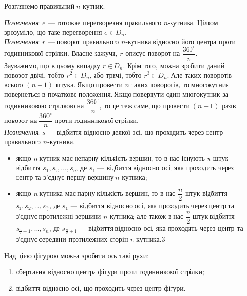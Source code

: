 \documentclass{math_library}
\begin{document}
Розглянемо правильний $n$-кутник.
\begin{figure}[H]
\centering
{}
\end{figure}
\textit{Позначення}: $e$ --- тотожне перетворення правильного $n$-кутника.
Цілком зрозуміло, що таке перетворення $e \in D_n$.
\bigskip \\
\textit{Позначення}: $r$ --- поворот правильного $n$-кутника відносно його центра проти годинникової стрілки. Власне кажучи, $r$ описує поворот на $\dfrac{360^\circ}{n}$.\\
Зауважимо, що в цьому випадку $r \in D_n$. Крім того, можна зробити даний поворот двічі, тобто $r^2 \in D_n$, або тричі, тобто $r^3 \in D_n$. Але таких поворотів всього $(n-1)$ штука. Якщо провести $n$ таких поворотів, то многокутник повернеться в початкове положення. Якщо повернути один многокутник за годинниковою стрілкою на $\dfrac{360^\circ}{n}$, то це теж саме, що провести $(n-1)$ разів поворот на $\dfrac{360^\circ}{n}$ проти годинникової стрілки.
\bigskip \\
\textit{Позначення}: $s$ --- відбиття відносно деякої осі, що проходить через центр правильного $n$-кутника.
\begin{itemize}[nosep,wide=0pt]
\item якщо $n$-кутник має непарну кількість вершин, то в нас існують $n$ штук відбиття $s_1,s_2,\dots,s_n$, де $s_1$ --- відбиття відносно осі, яка проходить через центр та з'єднує першу вершину $n$-кутника;
\item якщо $n$-кутника має парну кількість вершин, то в нас $\dfrac{n}{2}$ штук відбиття $s_1,s_2,\dots,s_{\frac{n}{2}}$, де $s_1$ --- відбиття відносно осі, яка проходить через центр та з'єднує протилежні вершини $n$-кутника; але також в нас $\dfrac{n}{2}$ штук відбиття $s_{\frac{n}{2}+1},\dots,s_{n}$, де $s_{\frac{n}{2}+1}$ --- відбиття відносно осі, яка проходить через центр та з'єднує середини протилежних сторін $n$-кутника.3
\end{itemize}

Над цією фігурою можна зробити ось такі рухи:
\begin{enumerate}[nosep,wide=0pt,label={\arabic*)}]
\item обертання відносно центра фігури проти годинникової стрілки;
\item відбиття відносно осі, що проходить через центр фігури.
\end{enumerate}
\end{document}
